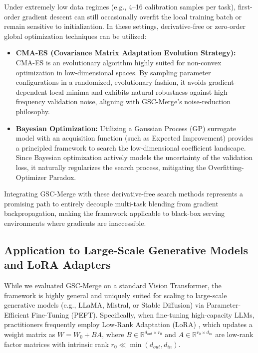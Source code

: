 Under extremely low data regimes (e.g., 4--16 calibration samples per task), first-order gradient descent can still occasionally overfit the local training batch or remain sensitive to initialization. In these settings, derivative-free or zero-order global optimization techniques can be utilized:
\begin{itemize}
    \item \textbf{CMA-ES (Covariance Matrix Adaptation Evolution Strategy):} CMA-ES \cite{hansen2001completely} is an evolutionary algorithm highly suited for non-convex optimization in low-dimensional spaces. By sampling parameter configurations in a randomized, evolutionary fashion, it avoids gradient-dependent local minima and exhibits natural robustness against high-frequency validation noise, aligning with GSC-Merge's noise-reduction philosophy.
    \item \textbf{Bayesian Optimization:} Utilizing a Gaussian Process (GP) surrogate model with an acquisition function (such as Expected Improvement) provides a principled framework to search the low-dimensional coefficient landscape. Since Bayesian optimization actively models the uncertainty of the validation loss, it naturally regularizes the search process, mitigating the Overfitting-Optimizer Paradox.
\end{itemize}
Integrating GSC-Merge with these derivative-free search methods represents a promising path to entirely decouple multi-task blending from gradient backpropagation, making the framework applicable to black-box serving environments where gradients are inaccessible.

\subsection{Application to Large-Scale Generative Models and LoRA Adapters}
\label{subsec:lora_merging}

While we evaluated GSC-Merge on a standard Vision Transformer, the framework is highly general and uniquely suited for scaling to large-scale generative models (e.g., LLaMA, Mistral, or Stable Diffusion) via Parameter-Efficient Fine-Tuning (PEFT). Specifically, when fine-tuning high-capacity LLMs, practitioners frequently employ Low-Rank Adaptation (LoRA) \cite{hu2021lora}, which updates a weight matrix as $W = W_0 + B A$, where $B \in \mathbb{R}^{d_{out} \times r_0}$ and $A \in \mathbb{R}^{r_0 \times d_{in}}$ are low-rank factor matrices with intrinsic rank $r_0 \ll \min(d_{out}, d_{in})$.

